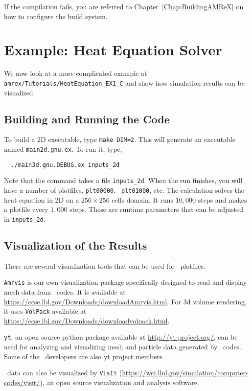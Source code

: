 If the compilation fails, you are referred to
Chapter~\ref{Chap:BuildingAMReX} on how to configure the build
system.

\section{Example: Heat Equation Solver}

We now look at a more complicated example at {\tt
  amrex/Tutorials/HeatEquation\_EX1\_C} and show how simulation
results can be visualized.

\subsection{Building and Running the Code}

To build a 2D executable, type {\tt make DIM=2}.  This will generate
an executable named {\tt main2d.gnu.ex}.  To run it, type,
\begin{verbatim}
  ./main3d.gnu.DEBUG.ex inputs_2d
\end{verbatim}
Note that the command takes a file {\tt inputs\_2d}.  When the run
finishes, you will have a number of plotfiles, {\tt plt00000}, {\tt
  plt01000}, etc.  The calculation solves the heat equation in 2D on a
$256 \times 256$ cells domain.  It runs $10,000$ steps and makes a
plotfile every $1,000$ steps.  These are runtime parameters that can
be adjusted in {\tt inputs\_2d}.

\subsection{Visualization of the Results}

There are several visualization tools that can be used for \amrex\
plotfiles.  

{\tt Amrvis} is our own visualization package specifically designed to
read and display mesh data from \amrex\ codes.  It is available at
\url{https://ccse.lbl.gov/Downloads/downloadAmrvis.html}.  For 3d
volume rendering, it uses {\tt VolPack} available at
\url{https://ccse.lbl.gov/Downloads/downloadvolpack.html}.

{\tt yt}, an open source python package available at
\url{http://yt-project.org/}, can be used for analyzing and
visualizing mesh and particle data generated by \amrex\ codes.  Some
of the \amrex\ developers are also yt project members.

\amrex\ data can also be visualized by {\tt VisIt}
(\url{https://wci.llnl.gov/simulation/computer-codes/visit/}), an open
source visualization and analysis software.

